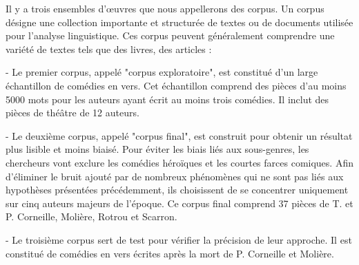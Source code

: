 \vspace{\baselineskip}
\hspace{0,5cm}Il y a trois ensembles d'œuvres que nous appellerons des corpus.  Un corpus
désigne une collection importante et structurée de textes ou de documents
utilisée pour l'analyse linguistique. Ces corpus peuvent généralement comprendre
une variété de textes tels que des livres, des articles :

\hspace{1cm}- Le premier corpus, appelé "corpus exploratoire", est constitué d'un large
échantillon de comédies en vers. Cet échantillon comprend des pièces d'au moins
5000 mots pour les auteurs ayant écrit au moins trois comédies. Il inclut des
pièces de théâtre de 12 auteurs.

\hspace{1cm}- Le deuxième corpus, appelé "corpus final", est construit pour obtenir un
résultat plus lisible et moins biaisé. Pour éviter les biais liés aux
sous-genres, les chercheurs vont exclure les comédies héroïques et les courtes
farces comiques. Afin d'éliminer le bruit ajouté par de nombreux phénomènes qui
ne sont pas liés aux hypothèses présentées précédemment, ils choisissent de se
concentrer uniquement sur cinq auteurs majeurs de l'époque.  Ce corpus final
comprend 37 pièces de T. et P. Corneille, Molière, Rotrou et Scarron.

\hspace{1cm}- Le troisième corpus sert de test pour vérifier la précision de leur approche. Il
est constitué de comédies en vers écrites après la mort de P. Corneille et
Molière.